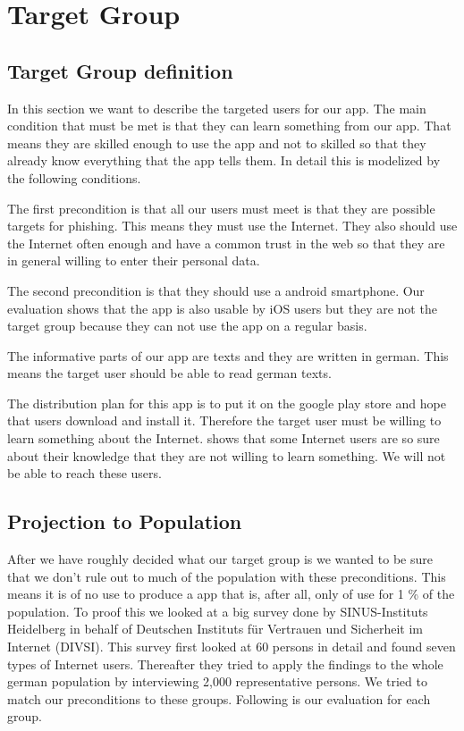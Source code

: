 \section{Target Group}
\label{s:target_group}

\subsection{Target Group definition}
In this section we want to describe the targeted users for our app.
The main condition that must be met is that they can learn something from our app.
That means they are skilled enough to use the app and not to skilled so that they already know everything that the app tells them.
In detail this is modelized by the following conditions.
\begin{description}[leftmargin=0cm]
\item[Attackabilty] The first precondition is that all our users must meet is that they are possible targets for phishing.
This means they must use the Internet.
They also should use the Internet often enough and have a common trust in the web so that they are in general willing to enter their personal data.
\cite{divsi2012divsi}
\item[Android users] The second precondition is that they should use a android smartphone.
Our evaluation shows that the app is also usable by iOS users but they are not the target group because they can not use the app on a regular basis.
\item[Language] The informative parts of our app are texts and they are written in german.
This means the target user should be able to read german texts.
\item[Motivation] The distribution plan for this app is to put it on the google play store and hope that users download and install it.
Therefore the target user must be willing to learn something about the Internet.
\cite{divsi2012divsi} shows that some Internet users are so sure about their knowledge that they are not willing to learn something.
We will not be able to reach these users.
\end{description}

\subsection{Projection to Population}
After we have roughly decided what our target group is we wanted to be sure that we don't rule out to much of the population with these preconditions.
This means it is of no use to produce a app that is, after all, only of use for 1 \% of the population.
To proof this we looked at a big survey done by SINUS-Instituts Heidelberg in behalf of Deutschen Instituts f\"{u}r Vertrauen und Sicherheit im Internet (DIVSI).
This survey first looked at 60 persons in detail and found seven types of Internet users.
Thereafter they tried to apply the findings to the whole german population by interviewing 2,000 representative persons.
We tried to match our preconditions to these groups. Following is our evaluation for each group\cite{divsi2012divsi}.

